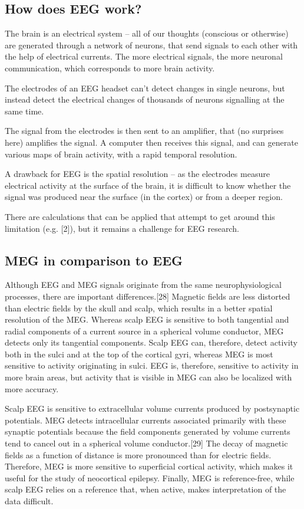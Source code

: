 \subsection{How does EEG work?}

The brain is an electrical system – all of our thoughts (conscious or otherwise) are generated through a network of neurons, that send signals to each other with the help of electrical currents. The more electrical signals, the more neuronal communication, which corresponds to more brain activity.

The electrodes of an EEG headset can’t detect changes in single neurons, but instead detect the electrical changes of thousands of neurons signalling at the same time.

The signal from the electrodes is then sent to an amplifier, that (no surprises here) amplifies the signal. A computer then receives this signal, and can generate various maps of brain activity, with a rapid temporal resolution.

A drawback for EEG is the spatial resolution – as the electrodes measure electrical activity at the surface of the brain, it is difficult to know whether the signal was produced near the surface (in the cortex) or from a deeper region.

There are calculations that can be applied that attempt to get around this limitation (e.g. [2]), but it remains a challenge for EEG research.

\subsection{MEG in comparison to EEG}
Although EEG and MEG signals originate from the same neurophysiological processes, there are important differences.[28] Magnetic fields are less distorted than electric fields by the skull and scalp, which results in a better spatial resolution of the MEG. Whereas scalp EEG is sensitive to both tangential and radial components of a current source in a spherical volume conductor, MEG detects only its tangential components. Scalp EEG can, therefore, detect activity both in the sulci and at the top of the cortical gyri, whereas MEG is most sensitive to activity originating in sulci. EEG is, therefore, sensitive to activity in more brain areas, but activity that is visible in MEG can also be localized with more accuracy.

Scalp EEG is sensitive to extracellular volume currents produced by postsynaptic potentials. MEG detects intracellular currents associated primarily with these synaptic potentials because the field components generated by volume currents tend to cancel out in a spherical volume conductor.[29] The decay of magnetic fields as a function of distance is more pronounced than for electric fields. Therefore, MEG is more sensitive to superficial cortical activity, which makes it useful for the study of neocortical epilepsy. Finally, MEG is reference-free, while scalp EEG relies on a reference that, when active, makes interpretation of the data difficult.


